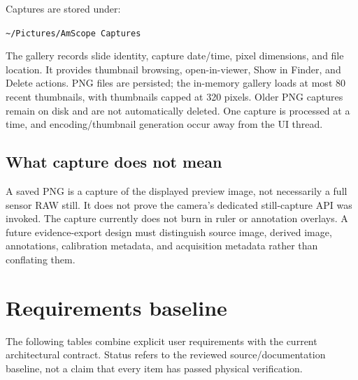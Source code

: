 \documentclass[11pt,a4paper,oneside]{article}
\newcommand{\code}[1]{\texttt{\small #1}}
\begin{document}
Captures are stored under:
\begin{center}
\code{\textasciitilde/Pictures/AmScope Captures}
\end{center}

The gallery records slide identity, capture date/time, pixel dimensions, and file location. It provides thumbnail browsing, open-in-viewer, Show in Finder, and Delete actions. PNG files are persisted; the in-memory gallery loads at most 80 recent thumbnails, with thumbnails capped at 320 pixels. Older PNG captures remain on disk and are not automatically deleted. One capture is processed at a time, and encoding/thumbnail generation occur away from the UI thread.

\subsection{What capture does not mean}
A saved PNG is a capture of the displayed preview image, not necessarily a full sensor RAW still. It does not prove the camera's dedicated still-capture API was invoked. The capture currently does not burn in ruler or annotation overlays. A future evidence-export design must distinguish source image, derived image, annotations, calibration metadata, and acquisition metadata rather than conflating them.

\section{Requirements baseline}

The following tables combine explicit user requirements with the current architectural contract. Status refers to the reviewed source/documentation baseline, not a claim that every item has passed physical verification.
\end{document}
